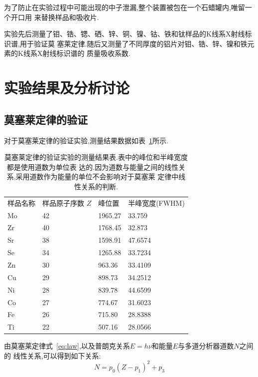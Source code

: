 \documentclass[aps,pre,12pt,preprint,onecolumn,showpacs,showkeys]{revtex4-1}
\begin{document}
为了防止在实验过程中可能出现的中子泄漏,整个装置被包在一个石蜡罐内,唯留一个开口用
来替换样品和吸收片.

实验先后测量了钼、锆、锶、硒、锌、铜、镍、钴、铁和钛样品的K线系X射线标识谱,用于验证莫
塞莱定律.随后又测量了不同厚度的铝片对钼、锆、锌、镍和铁元素的K线系X射线标识谱的
质量吸收系数.

\section{实验结果及分析讨论}

\subsection{莫塞莱定律的验证}

对于莫塞莱定律的验证实验,测量结果数据如表~\ref{tab:data1}所示.

\begin{table}[htbp]
  \caption{\label{tab:data1}
      莫塞莱定律的验证实验的测量结果表.表中的峰位和半峰宽度都是使用道数为单位表
      达的.因为道数与能量之间的线性关系,采用道数作为能量的单位不会影响对于莫塞莱
      定律中线性关系的判断.
  }
\begin{ruledtabular}
  \begin{tabular}{llll}
      样品名称 & 样品原子序数 $Z$ & 峰位置 & 半峰宽度(FWHM) \\
    \colrule
    Mo & 42 & 1965.27 & 33.759 \\
    Zr & 40 & 1768.45 & 32.873 \\
    Sr & 38 & 1598.91 & 47.6574 \\
    Se & 34 & 1265.88 & 33.7234 \\
    Zn & 30 & 963.36 & 33.4109 \\
    Cu & 29 & 898.73 & 34.2512 \\
    Ni & 28 & 839.78 & 44.6599 \\
    Co & 27 & 774.67 & 31.6023 \\
    Fe & 26 & 715.80 & 28.8388 \\
    Ti & 22 & 507.16 & 28.0566
\end{tabular}
\end{ruledtabular}
\end{table}
 
由莫塞莱定律式~\ref{eq:law},以及普朗克关系$E = h\nu$和能量$E$与多道分析器道数$N$之间的
线性关系,可以得到如下关系:
\begin{equation}
    \label{eq:relation}
    N = p_0(Z - p_1)^2 + p_3
\end{equation}
\end{document}
